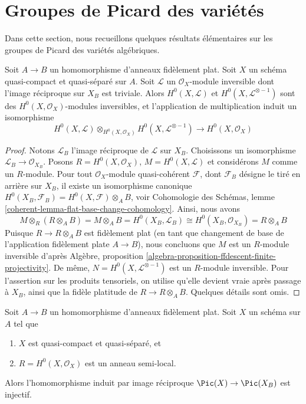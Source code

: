 \section{Groupes de Picard des variétés} 
\label{section-picard-groups}

\noindent
 Dans cette section, nous recueillons quelques résultats élémentaires sur les groupes de
Picard des variétés algébriques.

\begin{lemma}
\label{lemma-change-rings-pic-pre}
 Soit $A \to B$ un homomorphisme d'anneaux fidèlement plat. Soit $X$ un schéma quasi-compact
et quasi-séparé sur $A$. Soit $\mathcal{L}$ un 
$\mathcal{O}_X$-module inversible dont l'image réciproque sur $X_B$ est triviale. Alors 
$H^0(X, \mathcal{L})$ et $H^0(X, \mathcal{L}^{\otimes -1})$ sont des 
$H^0(X, \mathcal{O}_X)$-modules inversibles,
et l'application de multiplication induit un isomorphisme 
$$
H^0(X, \mathcal{L}) \otimes_{H^0(X, \mathcal{O}_X)}
H^0(X, \mathcal{L}^{\otimes -1}) \longrightarrow
H^0(X, \mathcal{O}_X)
$$
\end{lemma}

\begin{proof}
 Notons $\mathcal{L}_B$ l'image réciproque de $\mathcal{L}$ sur $X_B$.
Choisissons un isomorphisme $\mathcal{L}_B \to \mathcal{O}_{X_B}$.
Posons $R = H^0(X, \mathcal{O}_X)$, $M = H^0(X, \mathcal{L})$ et considérons 
$M$ comme un $R$-module. Pour tout $\mathcal{O}_X$-module quasi-cohérent 
$\mathcal{F}$, dont $\mathcal{F}_B$ désigne le tiré en arrière sur $X_B$, il
existe un isomorphisme canonique 
$H^0(X_B, \mathcal{F}_B) = H^0(X, \mathcal{F}) \otimes_A B$,
voir Cohomologie des Schémas, lemme \ref{coherent-lemma-flat-base-change-cohomology}.
Ainsi, nous avons 
$$
M \otimes_R (R \otimes_A B) =
M \otimes_A B = H^0(X_B, \mathcal{L}_B) \cong
H^0(X_B, \mathcal{O}_{X_B}) = R \otimes_A B
$$
 Puisque $R \to R \otimes_A B$ est fidèlement plat (en tant que changement de
base de l'application fidèlement plate $A \to B$), nous concluons
que $M$ est un $R$-module inversible
d'après Algèbre, proposition \ref{algebra-proposition-ffdescent-finite-projectivity}.
De même, $N = H^0(X, \mathcal{L}^{\otimes -1})$ est un $R$-module inversible.
 Pour l'assertion sur les produits tensoriels, on utilise qu'elle devient vraie après
passage à $X_B$, ainsi que la fidèle platitude de $R \to R \otimes_A B$.
Quelques détails sont omis. 
\end{proof}

\begin{lemma}
\label{lemma-change-rings-pic}
 Soit $A \to B$ un homomorphisme d'anneaux fidèlement plat. Soit
$X$ un schéma sur $A$ tel que 
\begin{enumerate}
\item $X$ est quasi-compact et quasi-séparé, et 
\item $R = H^0(X, \mathcal{O}_X)$ est un anneau semi-local. 
\end{enumerate}
 Alors l'homomorphisme induit par image réciproque $\Pic(X) \to \Pic(X_B)$ est injectif. 
\end{lemma}

